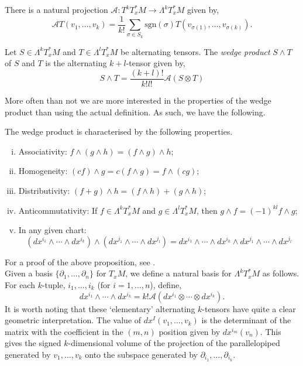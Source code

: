 \documentclass[12pt,a4paper]{article}
\begin{document}
There is a natural projection $\mathcal{A}:T^kT^*_xM\to\Lambda^kT^*_xM$ given by,
\[
\mathcal{A}T(v_1,\ldots,v_k)=\frac{1}{k!}\sum_{\sigma\in S_k}\mathrm{sgn}(\sigma)T(v_{\sigma(1)},\ldots,v_{\sigma(k)}).
\]
\begin{definition}
Let $S\in\Lambda^kT^*_xM$ and $T\in\Lambda^lT^*_xM$ be alternating tensors. The \textit{wedge product} $S\wedge T$ of $S$ and $T$ is the alternating $k+l$-tensor given by,
\[
S\wedge T=\frac{(k+l)!}{k!l!}\mathcal{A}(S\otimes T)
\]
\end{definition}
More often than not we are more interested in the properties of the wedge product than using the actual definition. As such, we have the following.
\begin{proposition}
The wedge product is characterised by the following properties.
\begin{enumerate}[(i)]
\item Associativity: $f\wedge(g\wedge h)=(f\wedge g)\wedge h$;
\item Homogeneity: $(cf)\wedge g=c(f\wedge g)=f\wedge(cg)$;
\item Distributivity: $(f+g)\wedge h=(f\wedge h)+(g\wedge h)$;
\item Anticommutativity: If $f\in\Lambda^kT^*_xM$ and $g\in\Lambda^l T^*_xM$, then $g\wedge f=(-1)^{kl}f\wedge g$;
\item In any given chart: \[(dx^{i_1}\wedge\cdots\wedge dx^{i_k})\wedge(dx^{j_1}\wedge\cdots\wedge dx^{j_l})=dx^{i_1}\wedge\cdots\wedge dx^{i_k}\wedge dx^{j_1}\wedge\cdots\wedge dx^{j_l} \]
\end{enumerate}
\end{proposition}
For a proof of the above proposition, see \cite{andrews}.\\

Given a basis $\{\partial_1,\ldots,\partial_n\}$ for $T_xM$, we define a natural basis for $\Lambda^kT^*_xM$ as follows. For each $k$-tuple, $i_1,\ldots,i_k$ (for $i=1,\ldots,n$), define,
\[
dx^{i_1}\wedge\cdots\wedge dx^{i_k}=k!\mathcal{A}(dx^{i_1}\otimes\cdots\otimes dx^{i_k}).
\]
It is worth noting that these `elementary' alternating $k$-tensors have quite a clear geometric interpretation. The value of $dx^I(v_1,\ldots,v_k)$ is the determinant of the matrix with the coefficient in the $(m,n)$ position given by $dx^{i_m}(v_n)$. This gives the signed $k$-dimensional volume of the projection of the parallelopiped generated by $v_1,\ldots,v_k$ onto the subspace generated by $\partial_{i_1},\ldots,\partial_{i_k}$.\\
\end{document}
